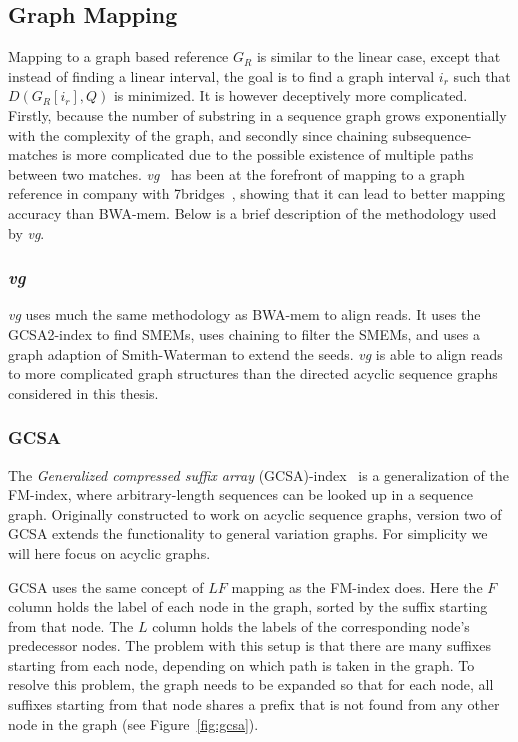 \subsection{Graph Mapping}
\label{sec:graphmapping}
Mapping to a graph based reference $G_R$ is similar to the linear case, except that instead of finding a linear interval, the goal is to find a graph interval $i_r$ such that $D(G_R[i_r], Q)$ is minimized.
It is however deceptively more complicated. 
Firstly, because the number of substring in a sequence graph grows exponentially with the complexity of the graph, and secondly since chaining subsequence-matches is more complicated due to the possible existence of multiple paths between two matches.
\emph{vg}~\cite{vg} has been at the forefront of mapping to a graph reference in company with 7bridges~\cite{7bridges}, showing that it can lead to better mapping accuracy than BWA-mem.
Below is a brief description of the methodology used by \emph{vg}.

\subsubsection{\emph{vg}}
\emph{vg} uses much the same methodology as BWA-mem to align reads.
It uses the GCSA2-index to find SMEMs, uses chaining to filter the SMEMs, and uses a graph adaption of Smith-Waterman to extend the seeds.
\emph{vg} is able to align reads to more complicated graph structures than the  directed acyclic sequence graphs considered in this thesis.

\subsubsection{GCSA}
The \emph{Generalized compressed suffix array} (GCSA)-index~\cite{gcsa1, gcsa2} is a generalization of the FM-index, where arbitrary-length sequences can be looked up in a sequence graph.
Originally constructed to work on acyclic sequence graphs, version two of GCSA extends the functionality to general variation graphs.
For simplicity we will here focus on acyclic graphs.

GCSA uses the same concept of $LF$ mapping as the FM-index does.
Here the $F$ column holds the label of each node in the graph, sorted by the suffix starting from that node.
The $L$ column holds the labels of the corresponding node's predecessor nodes.
The problem with this setup is that there are many suffixes starting from each node, depending on which path is taken in the graph.
To resolve this problem, the graph needs to be expanded so that for each node, all suffixes starting from that node shares a prefix that is not found from any other node in the graph (see Figure~\ref{fig:gcsa}).

